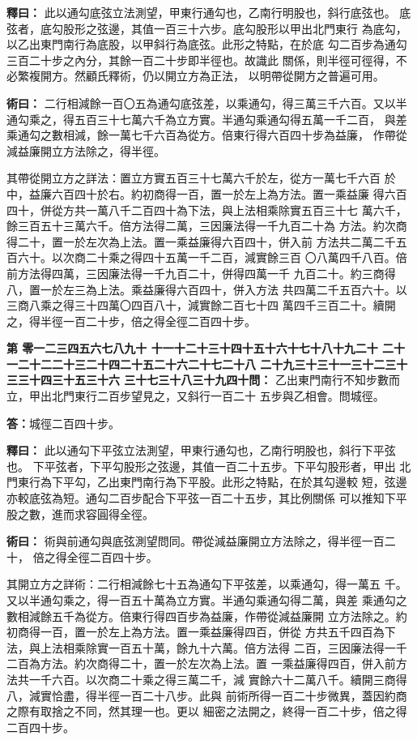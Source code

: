\documentclass[11pt,a4paper]{article}
\newcounter{probnum}
\newcommand{\chnum}[1]{%
  \ifcase#1 零\or 一\or 二\or 三\or 四\or 五\or 六\or 七\or 八\or 九\or 十\or
    十一\or 十二\or 十三\or 十四\or 十五\or 十六\or 十七\or 十八\or 十九\or 二十\or
    二十一\or 二十二\or 二十三\or 二十四\or 二十五\or 二十六\or 二十七\or 二十八\or
    二十九\or 三十\or 三十一\or 三十二\or 三十三\or 三十四\or 三十五\or 三十六\or
    三十七\or 三十八\or 三十九\or 四十\fi}
\newcommand{\problem}[1]{\stepcounter{probnum}\par\noindent\textbf{第\chnum{\value{probnum}}問：}#1\par}
\newcommand{\answer}[1]{\par\noindent\textbf{答：}#1\par}
\newcommand{\shiyi}[1]{\par\noindent\textbf{釋曰：}#1\par}
\newcommand{\shuyue}[1]{\par\noindent\textbf{術曰：}#1\par}
\begin{document}
\shiyi{
此以通勾底弦立法測望，甲東行通勾也，乙南行明股也，斜行底弦也。
底弦者，底勾股形之弦邊，其值一百三十六步。底勾股形以甲出北門東行
為底勾，以乙出東門南行為底股，以甲斜行為底弦。此形之特點，在於底
勾二百步為通勾三百二十步之內分，其餘一百二十步即半徑也。故識此
關係，則半徑可徑得，不必繁複開方。然顧氏釋術，仍以開立方為正法，
以明帶從開方之普遍可用。
}

\shuyue{
二行相減餘一百〇五為通勾底弦差，以乘通勾，得三萬三千六百。又以半
通勾乘之，得五百三十七萬六千為立方實。半通勾乘通勾得五萬一千二百，
與差乘通勾之數相減，餘一萬七千六百為從方。倍東行得六百四十步為益廉，
作帶從減益廉開立方法除之，得半徑。

其帶從開立方之詳法：置立方實五百三十七萬六千於左，從方一萬七千六百
於中，益廉六百四十於右。約初商得一百，置一於左上為方法。置一乘益廉
得六百四十，併從方共一萬八千二百四十為下法，與上法相乘除實五百三十七
萬六千，餘三百五十三萬六千。倍方法得二萬，三因廉法得一千九百二十為
方法。約次商得二十，置一於左次為上法。置一乘益廉得六百四十，併入前
方法共二萬二千五百六十。以次商二十乘之得四十五萬一千二百，減實餘三百
〇八萬四千八百。倍前方法得四萬，三因廉法得一千九百二十，併得四萬一千
九百二十。約三商得八，置一於左三為上法。乘益廉得六百四十，併入方法
共四萬二千五百六十。以三商八乘之得三十四萬〇四百八十，減實餘二百七十四
萬四千三百二十。續開之，得半徑一百二十步，倍之得全徑二百四十步。
}

\vspace{0.3cm}
\problem{
乙出東門南行不知步數而立，甲出北門東行二百步望見之，又斜行一百二十
五步與乙相會。問城徑。
}

\answer{城徑二百四十步。}

\shiyi{
此以通勾下平弦立法測望，甲東行通勾也，乙南行明股也，斜行下平弦也。
下平弦者，下平勾股形之弦邊，其值一百二十五步。下平勾股形者，甲出
北門東行為下平勾，乙出東門南行為下平股。此形之特點，在於其勾邊較
短，弦邊亦較底弦為短。通勾二百步配合下平弦一百二十五步，其比例關係
可以推知下平股之數，進而求容圓得全徑。
}

\shuyue{
術與前通勾與底弦測望問同。帶從減益廉開立方法除之，得半徑一百二十，
倍之得全徑二百四十步。

其開立方之詳術：二行相減餘七十五為通勾下平弦差，以乘通勾，得一萬五
千。又以半通勾乘之，得一百五十萬為立方實。半通勾乘通勾得二萬，與差
乘通勾之數相減餘五千為從方。倍東行得四百步為益廉，作帶從減益廉開
立方法除之。約初商得一百，置一於左上為方法。置一乘益廉得四百，併從
方共五千四百為下法，與上法相乘除實一百五十萬，餘九十六萬。倍方法得
二百，三因廉法得一千二百為方法。約次商得二十，置一於左次為上法。置
一乘益廉得四百，併入前方法共一千六百。以次商二十乘之得三萬二千，減
實餘六十二萬八千。續開三商得八，減實恰盡，得半徑一百二十八步。此與
前術所得一百二十步微異，蓋因約商之際有取捨之不同，然其理一也。更以
細密之法開之，終得一百二十步，倍之得二百四十步。
}
\end{document}
